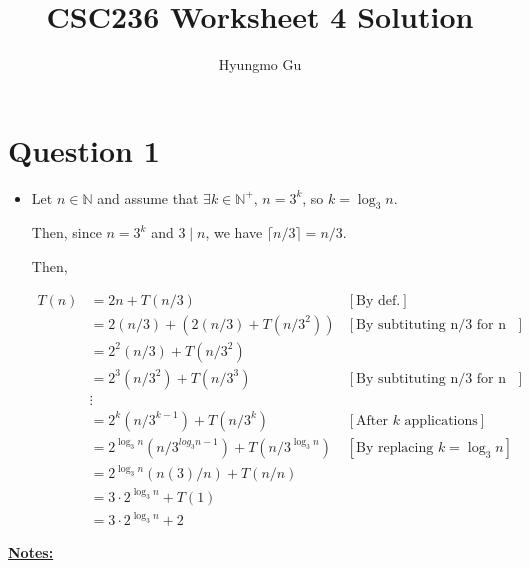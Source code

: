 \documentclass[12pt]{article}
\begin{document}
\title{CSC236 Worksheet 4 Solution}
\author{Hyungmo Gu}
\maketitle

\section*{Question 1}
\begin{itemize}
    \item

    Let $n \in \mathbb{N}$ and assume that $\exists k \in \mathbb{N}^+$, $n = 3^k$,
    so $k = \log_3 n$.

    \bigskip

    Then, since $n = 3^k$ and $3 \mid n$, we have $\lceil n/3 \rceil = n/3$.

    \bigskip

    Then,

    \begin{align}
        T(n) &= 2n + T(n/3) & [\text{By def.}]\\
        &= 2(n/3) + (2(n/3) +  T(n/3^2)) & [\text{By subtituting n/3 for n in def.}]\\
        &= 2^2(n/3) + T(n/3^2)\\
        &= 2^3(n/3^2) + T(n/3^3) & [\text{By subtituting n/3 for n in def.}]\\
        &\vdots\\
        &= 2^k(n/3^{k-1}) + T(n/3^k) & [\text{After $k$ applications}]\\
        &= 2^{\log_3 n}(n/3^{log_3 n - 1}) + T(n/3^{\log_3 n}) & [\text{By replacing $k = \log_3 n$}]\\
        &= 2^{\log_3 n}(n(3)/n) + T(n/n)\\
        &= 3 \cdot 2^{\log_3 n} + T(1)\\
        &= 3 \cdot 2^{\log_3 n} + 2
    \end{align}
\end{itemize}

\bigskip

\underline{\textbf{Notes:}}
\end{document}
